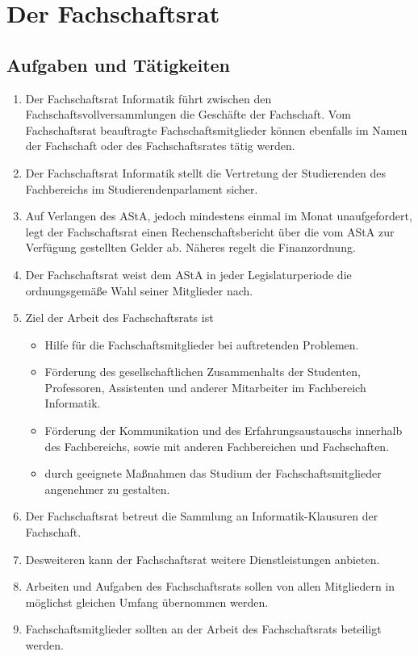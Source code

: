 \section{Der Fachschaftsrat}
\subsection{Aufgaben und Tätigkeiten}
\begin{enumerate}
\item Der Fachschaftsrat Informatik führt zwischen den Fachschaftsvollversammlungen die Geschäfte der Fachschaft. Vom Fachschaftsrat beauftragte Fachschaftsmitglieder können ebenfalls im Namen der Fachschaft oder des Fachschaftsrates tätig werden.
\item Der Fachschaftsrat Informatik stellt die Vertretung der Studierenden des Fachbereichs im Studierendenparlament sicher.
\item Auf Verlangen des AStA, jedoch mindestens einmal im Monat unaufgefordert, legt der Fachschaftsrat einen Rechenschaftsbericht über die vom AStA zur Verfügung gestellten Gelder ab. Näheres regelt die Finanzordnung.
\item Der Fachschaftsrat weist dem AStA in jeder Legislaturperiode die ordnungsgemäße Wahl seiner Mitglieder nach.
\item Ziel der Arbeit des Fachschaftsrats ist
\begin{itemize}
\item Hilfe für die Fachschaftsmitglieder bei auftretenden Problemen.
\item Förderung des gesellschaftlichen Zusammenhalts der Studenten, Professoren, Assistenten und anderer Mitarbeiter im Fachbereich Informatik.
\item Förderung der Kommunikation und des Erfahrungsaustauschs innerhalb des Fachbereichs, sowie mit anderen Fachbereichen und Fachschaften.
\item durch geeignete Maßnahmen das Studium der Fachschaftsmitglieder angenehmer zu gestalten.
\end{itemize}
\item Der Fachschaftsrat betreut die Sammlung an Informatik-Klausuren der Fachschaft.
\item Desweiteren kann der Fachschaftsrat weitere Dienstleistungen anbieten.
\item Arbeiten und Aufgaben des Fachschaftsrats sollen von allen Mitgliedern in möglichst gleichen Umfang übernommen werden.
\item Fachschaftsmitglieder sollten an der Arbeit des Fachschaftsrats beteiligt werden.
\end{enumerate}

